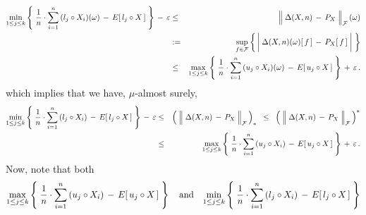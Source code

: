 \begin{eqnarray*}
	\underset{1\leq j \leq k}{\min}\left\{\;
		\dfrac{1}{n}\cdot \overset{n}{\underset{i=1}{\sum}}\,(l_{j} \circ X_{i})(\omega)
		\,\overset{{\color{white}+}}{-}\,
		E[\,l_{j} \circ X\,]
		\;\right\}
	\,\overset{{\color{white}+}}{-}\,
	\varepsilon
& \leq &
	\left\Vert\;\Delta(X,n) \,\overset{{\color{white}.}}{-}\, P_{X}\;\right\Vert_{\mathcal{F}}(\omega)
\\
& := &
%
	\underset{f\in\mathcal{F}}{\sup}\left\{\,
		\left\vert\; \Delta(X,n)(\omega)[\,f\,]\,\overset{{\color{white}+}}{-}\,P_{X}[\,f\,] \;\right\vert
	\;\right\}
\\
& \leq &
	\underset{1\leq j \leq k}{\max}\left\{\;
		\dfrac{1}{n}\cdot \overset{n}{\underset{i=1}{\sum}}\,(u_{j} \circ X_{i})(\omega)
		\,\overset{{\color{white}+}}{-}\,
		E[\,u_{j} \circ X\,]
		\;\right\}
	\,\overset{{\color{white}+}}{+}\,
	\varepsilon\,.
\end{eqnarray*}
which implies that we have, $\mu$-almost surely,
\begin{eqnarray*}
	\underset{1\leq j \leq k}{\min}\left\{\;
		\dfrac{1}{n}\cdot \overset{n}{\underset{i=1}{\sum}}\,(l_{j} \circ X_{i})
		\,\overset{{\color{white}+}}{-}\,
		E[\,l_{j} \circ X\,]
		\;\right\}
	\,\overset{{\color{white}+}}{-}\,
	\varepsilon
& \leq &
	\left(\;\left\Vert\;\Delta(X,n) \,\overset{{\color{white}.}}{-}\, P_{X}\;\right\Vert_{\mathcal{F}}\,\right)_{*}
\;\; \leq \;\;
	\left(\;\left\Vert\;\Delta(X,n) \,\overset{{\color{white}.}}{-}\, P_{X}\;\right\Vert_{\mathcal{F}}\,\right)^{*}
\\
& \leq &
	\underset{1\leq j \leq k}{\max}\left\{\;
		\dfrac{1}{n}\cdot \overset{n}{\underset{i=1}{\sum}}\,(u_{j} \circ X_{i})
		\,\overset{{\color{white}+}}{-}\,
		E[\,u_{j} \circ X\,]
		\;\right\}
	\,\overset{{\color{white}+}}{+}\,
	\varepsilon\,.
\end{eqnarray*}
Now, note that both
\begin{equation*}
	\underset{1\leq j \leq k}{\max}\left\{\;
		\dfrac{1}{n}\cdot \overset{n}{\underset{i=1}{\sum}}\,(u_{j} \circ X_{i})
		\,\overset{{\color{white}+}}{-}\,
		E[\,u_{j} \circ X\,]
	\;\right\}
\quad\textnormal{and}\quad
	\underset{1\leq j \leq k}{\min}\left\{\;
		\dfrac{1}{n}\cdot \overset{n}{\underset{i=1}{\sum}}\,(l_{j} \circ X_{i})
		\,\overset{{\color{white}+}}{-}\,
		E[\,l_{j} \circ X\,]
	\;\right\}
\end{equation*}
